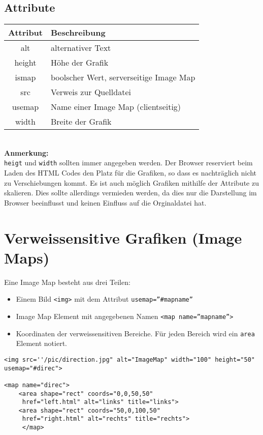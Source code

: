 \subsection{Attribute}
\begin{tabular}{|c|l|}
\hline
\rowcolor{lstback}\textbf{Attribut}	&\textbf{Beschreibung}\\
\hline
alt		&alternativer Text\\
\hline
height	&Höhe der Grafik\\
\hline
ismap	&boolscher Wert, serverseitige Image Map\\
\hline
src		&Verweis zur Quelldatei\\
\hline
usemap	&Name einer Image Map (clientseitig)\\
\hline
width		&Breite der Grafik\\
\hline
\end{tabular}\\[1em]
\textbf{Anmerkung:}\\
\texttt{heigt} und \texttt{width} sollten immer angegeben werden. Der Browser reserviert beim Laden des HTML Codes den Platz für die Grafiken, so dass es nachträglich nicht zu Verschiebungen kommt. Es ist auch möglich Grafiken mithilfe der Attribute zu skalieren. Dies sollte allerdings vermieden werden, da dies nur die Darstellung im Browser beeinflusst und keinen Einfluss auf die Orginaldatei hat.
\section{Verweissensitive Grafiken (Image Maps)}
Eine Image Map besteht aus drei Teilen:
\begin{itemize}
\item Einem Bild \texttt{<img>} mit dem Attribut \texttt{usemap=''\#mapname''}
\item Image Map Element mit angegebenen Namen \texttt{<map name=''mapname''>} 
\item Koordinaten der verweissensitiven Bereiche. Für jeden Bereich wird ein \texttt{area} Element notiert.
\end{itemize}
\begin{lstlisting}[caption=''Image Map Beispiel'']
<img src=''/pic/direction.jpg" alt="ImageMap" width="100" height="50" usemap="#direc">

<map name="direc">
    <area shape="rect" coords="0,0,50,50"
     href="left.html" alt="links" title="links">
    <area shape="rect" coords="50,0,100,50"
     href="right.html" alt="rechts" title="rechts">
     </map>
\end{lstlisting}
